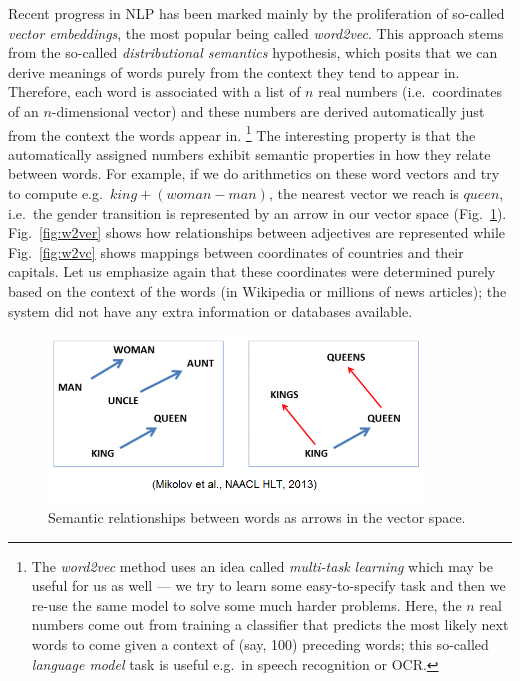 Recent progress in NLP has been marked mainly by the proliferation of
so-called \textit{vector embeddings}, the most popular being called
\textit{word2vec}.  This approach stems from the so-called \textit{distributional semantics}
hypothesis, which posits that we can derive meanings of words purely
from the context they tend to appear in.  Therefore, each word is
associated with a list of $n$ real numbers (i.e.\ coordinates of
an $n$-dimensional vector) and these numbers are derived automatically
just from the context the words appear in.%
\footnote{The \textit{word2vec} method uses an idea called \textit{multi-task learning}
	which may be useful for us as well --- we try to learn
	some easy-to-specify task and then we re-use the same model to
	solve some much harder problems.  Here, the $n$ real numbers
	come out from training a classifier that predicts the most likely
	next words to come given a context of (say, 100) preceding words;
	this so-called \textit{language model} task is useful e.g.\ in
	speech recognition or OCR.}
The interesting property is that the automatically assigned numbers
exhibit semantic properties in how they relate between words.
For example, if we do arithmetics on these word vectors and try
to compute e.g.\ $king + (woman - man)$, the nearest vector we reach
is $queen$, i.e.\ the gender transition is represented by an arrow
in our vector space (Fig.~\ref{fig:w2vg}).
Fig.~\ref{fig:w2ver} shows how relationships between adjectives are represented
while Fig.~\ref{fig:w2vc} shows mappings between coordinates of countries
and their capitals.  Let us emphasize again that these coordinates were
determined purely based on the context of the words (in Wikipedia or
millions of news articles); the system did not have any extra information
or databases available.

\begin{figure}[ht]
	\centering
	\includegraphics[width=10cm]{kingqueen.png}
	\caption{Semantic relationships between words as arrows in the vector space. \citep{WordVecLingReg}}
	\label{fig:w2vg}
\end{figure}


